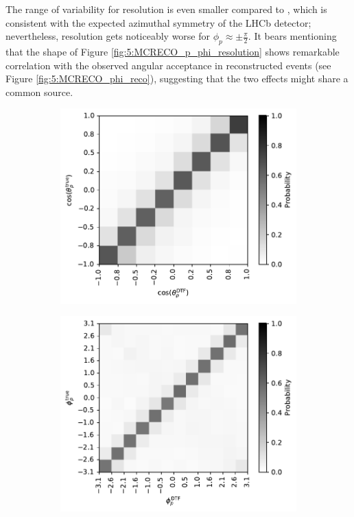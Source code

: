 The range of variability for \phip resolution is even smaller compared to \cthetap, which is consistent with the expected azimuthal symmetry of the LHCb detector;
nevertheless, resolution gets noticeably worse for $\phi_p \approx \pm \frac{\pi}{2}$.
It bears mentioning that the shape of Figure \ref{fig:5:MCRECO_p_phi_resolution} shows remarkable correlation with the observed angular \phip acceptance in reconstructed events (see Figure \ref{fig:5:MCRECO_phi_reco}), suggesting that the two effects might share a common source.

\begin{figure}[t]
	\centering
	\begin{subfigure}{.45\textwidth}
		\includegraphics[width=\textwidth]{graphics/05-angular_distributions/MCRECO_p_theta_migration.pdf}
		\caption{}
		\label{fig:5:MCRECO_p_theta_migration}
	\end{subfigure}
	\begin{subfigure}{.45\textwidth}
		\includegraphics[width=\textwidth]{graphics/05-angular_distributions/MCRECO_p_phi_migration.pdf}

\end{subfigure}
\end{figure}
